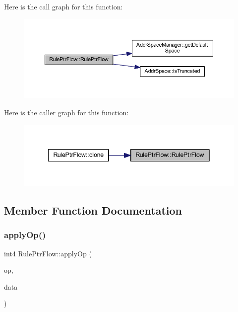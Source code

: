 Here is the call graph for this function\+:
\nopagebreak
\begin{figure}[H]
\begin{center}
\leavevmode
\includegraphics[width=350pt]{class_rule_ptr_flow_a30a05dd13b867b4d8e99358a13969626_cgraph}
\end{center}
\end{figure}
Here is the caller graph for this function\+:
\nopagebreak
\begin{figure}[H]
\begin{center}
\leavevmode
\includegraphics[width=342pt]{class_rule_ptr_flow_a30a05dd13b867b4d8e99358a13969626_icgraph}
\end{center}
\end{figure}


\subsection{Member Function Documentation}
\mbox{\label{class_rule_ptr_flow_a4f230dae0158096df0c68cd373abaaf6}} 
\subsubsection{\texorpdfstring{applyOp()}{applyOp()}}
{\footnotesize\ttfamily int4 Rule\+Ptr\+Flow\+::apply\+Op (\begin{DoxyParamCaption}\item[{\mbox{\hyperlink{class_pcode_op}{Pcode\+Op}} $\ast$}]{op,  }\item[{\mbox{\hyperlink{class_funcdata}{Funcdata}} \&}]{data }\end{DoxyParamCaption})\hspace{0.3cm}{\ttfamily [virtual]}}



